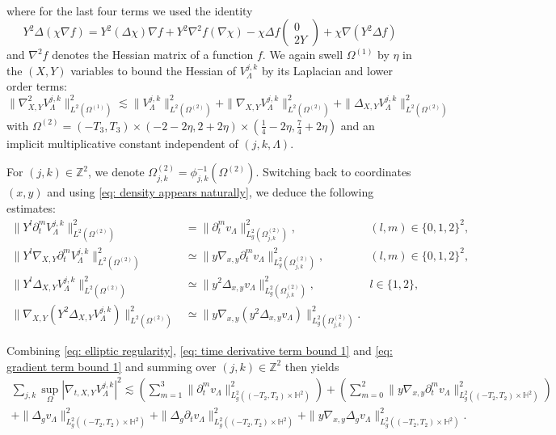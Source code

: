 \documentclass[letterpaper,11pt]{amsart}
\theoremstyle{note}
\numberwithin{equation}{section}
\begin{document}
\begin{multline}
\end{multline} where for the last four terms we used the identity $$Y^2\Delta(\chi \nabla f) = Y^2 (\Delta \chi) \nabla f + Y^2 \nabla^2 f (\nabla \chi) - \chi \Delta f \begin{pmatrix} 0 \\ 2Y \end{pmatrix}+ \chi \nabla(Y^2 \Delta f)$$ and $\nabla^2 f$ denotes the Hessian matrix of a function $f$. We again swell $\Omega^{(1)}$ by $\eta$ in the $(X,Y)$ variables to bound the Hessian of $V_\Lambda^{j,k}$ by its Laplacian and lower order terms: $$\|\nabla_{X,Y}^2 V_\Lambda^{j,k}\|_{L^2(\Omega^{(1)})}^2 \lesssim \|V_\Lambda^{j,k}\|_{L^2(\Omega^{(2)})}^2 + \|\nabla_{X,Y} V_\Lambda^{j,k}\|_{L^2(\Omega^{(2)})}^2 + \|\Delta_{X,Y} V_\Lambda^{j,k}\|_{L^2(\Omega^{(2)})}^2$$ with $\Omega^{(2)} = (-T_3,T_3) \times (-2-2\eta,2+2\eta) \times \left(\frac{1}{4}-2\eta,\frac{7}{4}+2\eta\right)$ and an implicit multiplicative constant independent of $(j,k, \Lambda)$.

For $(j,k) \in \mathbb{Z}^2$, we denote $\Omega^{(2)}_{j,k} = \phi_{j,k}^{-1}(\Omega^{(2)})$. Switching back to coordinates $(x,y)$ and using \eqref{eq: density appears naturally}, we deduce the following estimates: $$\begin{aligned}\|Y^l \partial_t^m V_\Lambda^{j,k}\|_{L^2(\Omega^{(2)})}^2 &= \|\partial_t^m v_\Lambda\|_{L^2_g\left(\Omega^{(2)}_{j,k}\right)}^2, & (l, m) \in \{0, 1, 2\}^2, \\ 
\|Y^l \nabla_{X,Y} \partial_t^m V_\Lambda^{j,k}\|_{L^2(\Omega^{(2)})}^2 & \simeq \|y \nabla_{x,y} \partial_t^m v_\Lambda\|_{L^2_g\left(\Omega^{(2)}_{j,k}\right)}^2, & (l,m) \in \{0, 1, 2\}^2, \\
\|Y^l \Delta_{X,Y} V_\Lambda^{j,k}\|_{L^2(\Omega^{(2)})}^2 &\simeq \|y^2 \Delta_{x,y} v_\Lambda\|_{L^2_g\left(\Omega^{(2)}_{j,k}\right)}^2, & l \in \{1,2\}, \\
\|\nabla_{X,Y} (Y^2 \Delta_{X,Y} V_\Lambda^{j,k}) \|_{L^2(\Omega^{(2)})}^2 &\simeq \|y \nabla_{x,y} (y^2 \Delta_{x,y} v_\Lambda) \|_{L^2_g\left(\Omega^{(2)}_{j,k}\right)}^2.
\end{aligned}$$

Combining \eqref{eq: elliptic regularity}, \eqref{eq: time derivative term bound 1} and \eqref{eq: gradient term bound 1} and summing over $(j,k) \in \mathbb{Z}^2$ then yields \begin{multline}
    \label{eq: summed inequality} \sum_{j,k} \sup_\Omega|\nabla_{t,X,Y} V_\Lambda^{j,k}|^2 \lesssim \left(\sum_{m=1}^3 \|\partial_t^m v_\Lambda\|_{L^2_g\left((-T_2,T_2) \times \mathbb{H}^2\right)}^2\right) + \left(\sum_{m=0}^2 \|y \nabla_{x,y} \partial_t^m v_\Lambda\|_{L^2_g\left((-T_2,T_2) \times \mathbb{H}^2\right)}^2 \right) \\+ \|\Delta_g v_\Lambda\|_{L^2_g\left((-T_2,T_2) \times \mathbb{H}^2\right)}^2 + \|\Delta_g \partial_t v_\Lambda\|_{L^2_g\left((-T_2,T_2) \times \mathbb{H}^2\right)}^2 + \|y\nabla_{x,y} \Delta_g v_\Lambda \|_{L^2_g\left((-T_2,T_2) \times \mathbb{H}^2\right)}^2.
\end{multline}
\end{document}
